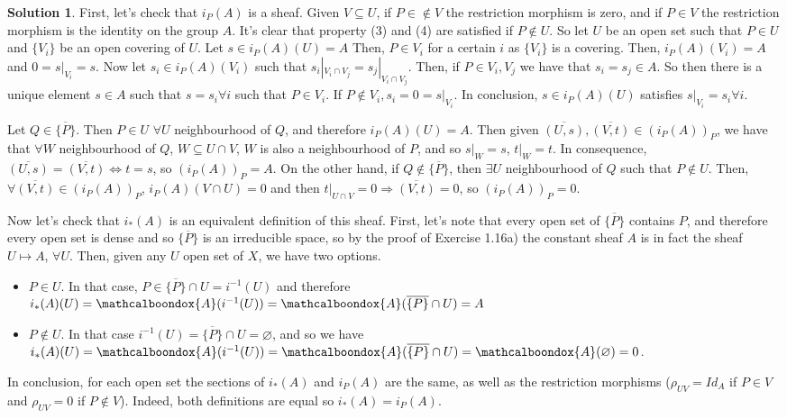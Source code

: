 \documentclass[12pt]{article}
\newcommand{\imp}{\ensuremath{\Rightarrow}}
\theoremstyle{definition}
\newtheorem*{sol}{Solution}
\newcommand{\sA}{\ensuremath{\mathcalboondox{A}}}
\begin{document}
\begin{sol}
	First, let's check that $i_P(A)$ is a sheaf. Given $V \subseteq U$, if $P \in \notin V$ the restriction morphism is zero, and if $P \in V$ the restriction morphism is the identity on the group $A$. It's clear that property (3) and (4) are satisfied if $P \notin U$. So let $U$ be an open set such that $P \in U$ and $\{V_i\}$ be an open covering of $U$. Let $s \in i_P(A)(U) = A$ Then, $P \in V_i$ for a certain $i$ as $\{V_i\}$ is a covering. Then, $i_P(A)(V_i) = A$ and $0 = s|_{V_i} = s$. Now let $s_i \in i_P(A)(V_i)$ such that $s_i|_{V_i \cap V_j} = s_j|_{V_i \cap V_j}$. Then, if $P \in V_i, V_j$ we have that $s_i = s_j \in A$. So then there is a unique element $s \in A$ such that $s = s_i \forall i$ such that $P \in V_i$. If $P \notin V_i, s_i = 0 = s|_{V_i}$. In conclusion, $s \in i_P(A)(U)$ satisfies $s|_{V_i} = s_i \forall i$.

	Let $Q \in \overline{\{P\}}$. Then $P \in U \, \, \forall U$ neighbourhood of $Q$, and therefore $i_P(A)(U) = A$. Then given $\overline{(U,s)}, \overline{(V,t)} \in (i_P(A))_P$, we have that $\forall W$ neighbourhood of $Q$, $W \subseteq U \cap V$, $W$ is also a neighbourhood of $P$, and so $s|_W = s$, $t|_W = t$. In consequence, $\overline{(U,s)} = \overline{(V,t)} \iff t = s$, so $(i_P(A))_P = A$.	On the other hand, if $Q \notin \overline{\{P\}}$, then $\exists U$ neighbourhood of $Q$ such that $P \notin U$. Then, $\forall \overline{(V,t)} \in (i_P(A))_P$, $i_P(A)(V \cap U) = 0$ and then $t|_{U \cap V} = 0 \imp \overline{(V,t)} = 0$, so $(i_P(A))_P = 0$.

	Now let's check that $i_{*}(A)$ is an equivalent definition of this sheaf. First, let's note that every open set of $\overline{\{P\}}$ contains $P$, and therefore every open set is dense and so $\overline{\{P\}}$ is an irreducible space, so by the proof of Exercise 1.16a) the constant sheaf $A$ is in fact the sheaf $U \mapsto A$, $\forall U$. Then, given any $U$ open set of $X$, we have two options.
	\begin{itemize}
		\item $P \in U$. In that case, $P \in \overline{\{P\}} \cap U = i^{-1}(U)$ and therefore $i_{*}(A)(U) = \sA(i^{-1}(U)) = \sA(\overline{\{P\}} \cap U) = A$

		\item $P \notin U$. In that case $i^{-1}(U) = \overline{\{P\}} \cap U = \varnothing$, and so we have $i_{*}(A)(U) = \sA(i^{-1}(U)) = \sA(\overline{\{P\}} \cap U) = \sA(\varnothing) = 0$.
	\end{itemize}
	In conclusion, for each open set the sections of $i_{*}(A)$ and  $i_P(A)$ are the same, as well as the restriction morphisms ($\rho_{UV} = Id_A$ if $P \in V$ and $\rho_{UV} = 0$ if $P \notin V$). Indeed, both definitions are equal so $i_{*}(A) = i_P(A)$.
\end{sol}
\end{document}
